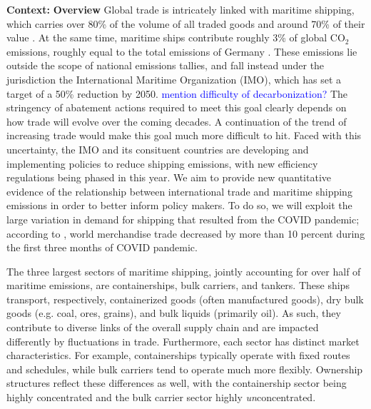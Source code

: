\documentclass[hidelinks, 12pt,letterpaper]{article}
\begin{document}
\noindent \textbf{Context:} 
\textbf{Overview}
Global trade is intricately linked with maritime shipping, which carries over 80\% of the volume of all traded goods and around 70\% of their value \citep{unctad2017review}. 
At the same time, maritime ships contribute roughly 3\% of global CO$_2$ emissions, roughly equal to the total emissions of Germany \citep*{faber2020fourth}. These emissions lie outside the scope of national emissions tallies, and fall instead under the jurisdiction the International Maritime Organization (IMO), which has set a target of a 50\% reduction by 2050.
\textcolor{blue}{mention difficulty of decarbonization?}
The stringency of abatement actions required to meet this goal clearly depends on how trade will evolve over the coming decades. A continuation of the trend of increasing trade would make this goal much more difficult to hit. Faced with this uncertainty, the IMO and its consituent countries are developing and implementing policies to reduce shipping emissions, with new efficiency regulations being phased in this year. We aim to provide new quantitative evidence of the relationship between international trade and maritime shipping emissions in order to better inform policy makers. To do so, we will exploit the large variation in demand for shipping that resulted from the COVID pandemic; according to \cite{oecd21}, world merchandise trade decreased by more than 10 percent during the first three months of COVID pandemic.

The three largest sectors of maritime shipping, jointly accounting for over half of maritime emissions, are containerships, bulk carriers, and tankers. These ships transport, respectively,  containerized goods (often manufactured goods), dry bulk goods (e.g. coal, ores, grains), and bulk liquids (primarily oil). As such, they contribute to diverse links of the overall supply chain and are impacted differently by fluctuations in trade. Furthermore, each sector has distinct market characteristics. For example, containerships typically operate with fixed routes and schedules, while bulk carriers tend to operate much more flexibly. Ownership structures reflect these differences as well, with the containership sector being highly concentrated and the bulk carrier sector highly \textit{un}concentrated.
\end{document}
